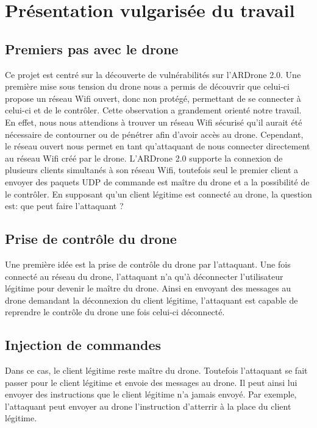 \section{Présentation vulgarisée du travail}
\subsection{Premiers pas avec le drone}
Ce projet est centré sur la découverte de vulnérabilités sur l'ARDrone 2.0. Une première mise sous tension du drone nous a permis de découvrir que celui-ci propose un réseau Wifi ouvert, donc non protégé, permettant de se connecter à celui-ci et de le contrôler. Cette observation a grandement orienté notre travail. En effet, nous nous attendions à trouver un réseau Wifi sécurisé qu'il aurait été nécessaire de contourner ou de pénétrer afin d'avoir accès au drone. Cependant, le réseau ouvert nous permet en tant qu'attaquant de nous connecter directement au réseau Wifi créé par le drone. L'ARDrone 2.0 supporte la connexion de plusieurs clients simultanés à son réseau Wifi, toutefois seul le premier client a envoyer des paquets UDP de commande est maître du drone et a la possibilité de le contrôler. En supposant qu'un client légitime est connecté au drone, la question est: que peut faire l'attaquant ?

\subsection{Prise de contrôle du drone}
Une première idée est la prise de contrôle du drone par l'attaquant. Une fois connecté au réseau du drone, l'attaquant n'a qu'à déconnecter l'utilisateur légitime pour devenir le maître du drone. Ainsi en envoyant des messages au drone demandant la déconnexion du client légitime, l'attaquant est capable de reprendre le contrôle du drone une fois celui-ci déconnecté.

\subsection{Injection de commandes}
Dans ce cas, le client légitime reste maître du drone. Toutefois l'attaquant se fait passer pour le client légitime et envoie des messages au drone. Il peut ainsi lui envoyer des instructions que le client légitime n'a jamais envoyé. Par exemple, l'attaquant peut envoyer au drone l'instruction d'atterrir à la place du client légitime.

